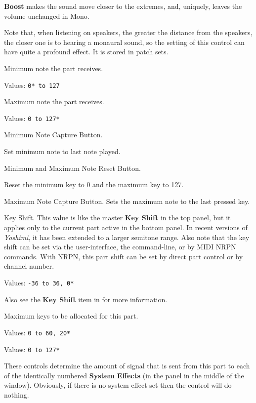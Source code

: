    \textbf{Boost} makes the sound move closer to the extremes, and, uniquely,
   leaves the volume unchanged in Mono.

   Note that, when listening on speakers, the greater the distance from the
   speakers, the closer one is to hearing a monaural sound, so the setting of
   this control can have quite a profound effect. It is stored in patch sets.

   Minimum note the part receives.

   Values: \texttt{0* to 127}

   Maximum note the part receives.

   Values: \texttt{0 to 127*}

   Minimum Note Capture Button.

   Set minimum note to last note played.

   Minimum and Maximum Note Reset Button.

   Reset the minimum key to 0 and the maximum key to 127.

   Maximum Note Capture Button.
   Sets the maximum note to the last pressed key.

   Key Shift.
   This value is like the master \textbf{Key Shift} in the top panel, but
   it applies only to the current part active in the bottom panel.
   In recent versions of \textsl{Yoshimi}, it has been extended to a larger
   semitone range.
   Also note that the key shift can be set via the user-interface, the
   command-line, or by MIDI NRPN commands.
   With NRPN, this part shift
   can be set by direct part control or by channel number.

   Values: \texttt{-36 to 36, 0*}

   Also see the \textbf{Key Shift} item in
   \hspace{4pt}for more information.

   Maximum keys to be allocated for this part.

   Values: \texttt{0 to 60, 20*}


   Values: \texttt{0 to 127*}

   These controls determine the amount of signal that is sent from this part to
   each of the identically numbered \textbf{System Effects} (in the panel in the
   middle of the window).
   Obviously, if there is no system effect set then the control will do nothing.

